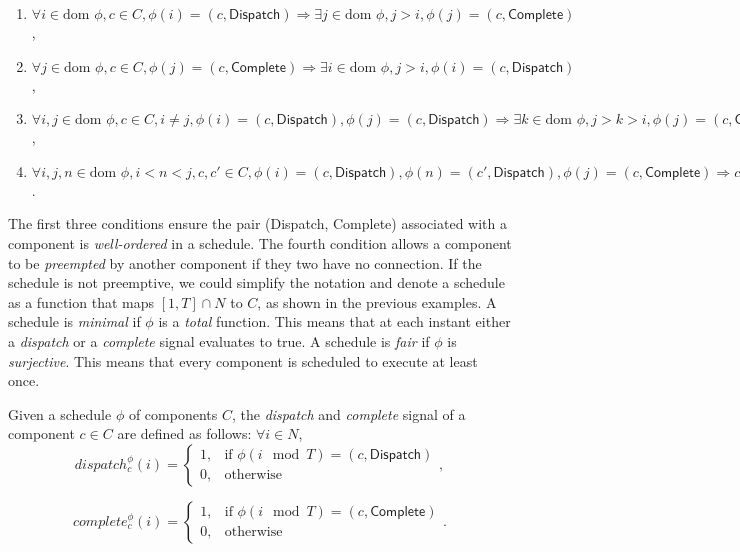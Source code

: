 \begin{enumerate}
	\item $ \forall i\in \text{dom }\phi, c\in C, \phi(i) = (c, \textsf{Dispatch}) \Rightarrow \exists j\in \text{dom }\phi, j > i, \phi(j) =  (c, \textsf{Complete}) $,
	\item $ \forall j\in \text{dom }\phi, c\in C, \phi(j) = (c, \textsf{Complete}) \Rightarrow \exists i\in \text{dom }\phi, j > i, \phi(i) =  (c, \textsf{Dispatch}) $,
	\item $ \forall i, j\in \text{dom }\phi, c\in C, i \neq j, \phi(i) = (c, \textsf{Dispatch}), \phi(j) = (c, \textsf{Dispatch}) \Rightarrow \exists k\in \text{dom }\phi, j >k> i, \phi(j) =  (c, \textsf{Complete}) $,
	\item $ \forall i, j, n\in \text{dom }\phi, i < n < j, c, c'\in C, \phi(i) = (c, \textsf{Dispatch}), \phi(n) = (c', \textsf{Dispatch}), \phi(j) = (c, \textsf{Complete}) \Rightarrow c, c' \text{ are not connected, and }\exists m\in \text{dom }\phi, n < m < j, \phi(m) =  (c', \textsf{Complete}) $.
\end{enumerate}

The first three conditions ensure the pair (\textsf{Dispatch}, \textsf{Complete}) associated with a component is \emph{well-ordered} in a schedule. 
The fourth condition allows a component to be \emph{preempted} by another component if they two have no connection.
If the schedule is not preemptive, we could simplify the notation and denote a schedule as a function that maps $[1, T] \cap N$ to $C$, as shown in the previous examples.
A schedule is \emph{minimal} if $\phi$ is a \emph{total} function. This means that at each instant either a \emph{dispatch} or a \emph{complete} signal evaluates to true. 
A schedule is \emph{fair} if $\phi$ is \emph{surjective}. This means that every component is scheduled to execute at least once.

Given a schedule $\phi$ of components $C$, the \emph{dispatch} and \emph{complete} signal of a component $c \in C$ are defined as follows: $\forall i \in N$,
\begin{equation*}
\label{eqn:dispatch}
    dispatch_c^\phi(i) =
    \begin{cases}
      1, & \text{if } \phi(i \mod T) = (c, \textsf{Dispatch}) \\
      0, & \text{otherwise}
    \end{cases},
\end{equation*}

\begin{equation*}
\label{eqn:complete}
    complete_c^\phi(i) =
    \begin{cases}
      1, & \text{if } \phi(i \mod T) = (c, \textsf{Complete}) \\
      0, & \text{otherwise}
    \end{cases}.
\end{equation*}

